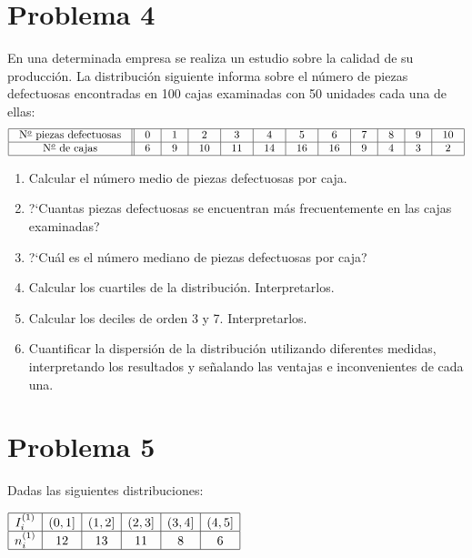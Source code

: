 \documentclass[hidequestions]{homework}
\begin{document}
	\section{Problema 4}
	\color{blue}
	En una determinada empresa se realiza un estudio sobre la calidad de su
	producci{\'o}n. La distribuci{\'o}n siguiente informa sobre el n{\'u}mero de  piezas
	defectuosas encontradas en 100 cajas examinadas con 50 unidades cada una
	de ellas:
	$$\setlength{\arraycolsep}{10pt}
	\begin{array}{|c||c|c|c|c|c|c|c|c|c|c|c|} \hline
	\mbox{N${}^{\underline{o}}$ piezas defectuosas} & 0 & 1 & 2  & 3
	& 4  & 5  & 6  & 7 & 8 & 9 & 10 \\ \hline
	\mbox{N${}^{\underline{o}}$ de cajas}           & 6 & 9 & 10 & 11
	& 14 & 16 & 16 & 9 & 4 & 3 & 2 \\ \hline
	\end{array}
	$$
	
	\begin{enumerate}
		\item Calcular el n{\'u}mero medio de piezas defectuosas por caja.
		\item ?`Cuantas piezas defectuosas se encuentran m{\'a}s frecuentemente en las
		cajas examinadas?
		\item ?`Cu{\'a}l es el n{\'u}mero mediano de piezas defectuosas por caja?
		\item Calcular los cuartiles de la distribuci{\'o}n. Interpretarlos.
		\item Calcular los deciles de orden 3 y 7. Interpretarlos.
		\item Cuantificar la dispersi{\'o}n de la  distribuci{\'o}n utilizando diferentes
		medidas, interpretando los resultados  y se{\~n}alando las ventajas e
		inconvenientes de cada una. \\
	\end{enumerate}
	\color{black}
	
	
	
	
	\section{Problema 5}
	\color{blue}
	Dadas las siguientes distribuciones:
	
	\setlength{}{4pt}
	$\begin{array}{|c|c|c|c|c|c|} \hline
	I_{i}^{(1)} & (0,1] & (1,2] & (2,3] & (3,4] & (4,5] \\ \hline
	n_{i}^{(1)} & 12  & 13  &  11 &  8  &  6  \\ \hline
	\end{array}$
	
\end{document}
